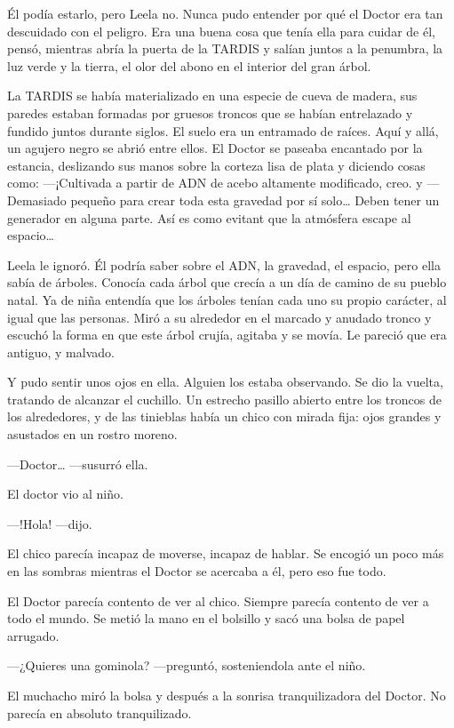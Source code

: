 Él podía estarlo, pero Leela no. Nunca pudo entender por qué el Doctor
era tan descuidado con el peligro. Era una buena cosa que tenía ella
para cuidar de él, pensó, mientras abría la puerta de la TARDIS y salían
juntos a la penumbra, la luz verde y la tierra, el olor del abono en el
interior del gran árbol.

La TARDIS se había materializado en una especie de cueva de madera, sus
paredes estaban formadas por gruesos troncos que se habían entrelazado y
fundido juntos durante siglos. El suelo era un entramado de raíces. Aquí
y allá, un agujero negro se abrió entre ellos. El Doctor se paseaba
encantado por la estancia, deslizando sus manos sobre la corteza lisa de
plata y diciendo cosas como: ---¡Cultivada a partir de ADN de acebo
altamente modificado, creo. y ---Demasiado pequeño para crear toda esta
gravedad por sí solo\ldots{} Deben tener un generador en alguna parte.
Así es como evitant que la atmósfera escape al espacio\ldots{}

Leela le ignoró. Él podría saber sobre el ADN, la gravedad, el espacio,
pero ella sabía de árboles. Conocía cada árbol que crecía a un día de
camino de su pueblo natal. Ya de niña entendía que los árboles tenían
cada uno su propio carácter, al igual que las personas. Miró a su
alrededor en el marcado y anudado tronco y escuchó la forma en que este
árbol crujía, agitaba y se movía. Le pareció que era antiguo, y malvado.

Y pudo sentir unos ojos en ella. Alguien los estaba observando. Se dio
la vuelta, tratando de alcanzar el cuchillo. Un estrecho pasillo abierto
entre los troncos de los alrededores, y de las tinieblas había un chico
con mirada fija: ojos grandes y asustados en un rostro moreno.

---Doctor\ldots{} ---susurró ella.

El doctor vio al niño.

---!Hola! ---dijo.

El chico parecía incapaz de moverse, incapaz de hablar. Se encogió un
poco más en las sombras mientras el Doctor se acercaba a él, pero eso
fue todo.

El Doctor parecía contento de ver al chico. Siempre parecía contento de
ver a todo el mundo. Se metió la mano en el bolsillo y sacó una bolsa de
papel arrugado.

---¿Quieres una gominola? ---preguntó, sosteniendola ante el niño.

El muchacho miró la bolsa y después a la sonrisa tranquilizadora del
Doctor. No parecía en absoluto tranquilizado.


